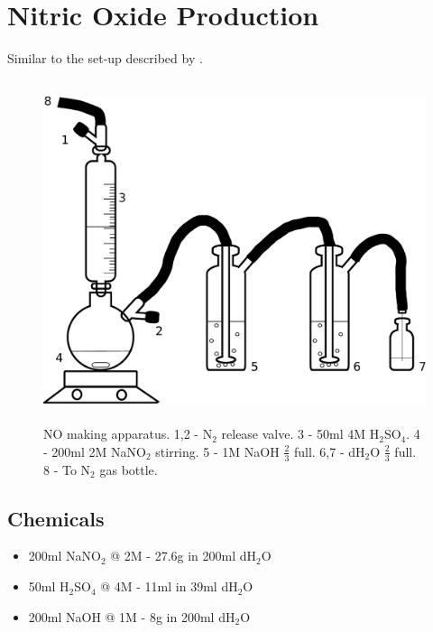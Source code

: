\section{Nitric Oxide Production}
Similar to the set-up described by \cite{Aga2008}.
\begin{figure}
 \centering
 \includegraphics[height=10cm]{./02-materialsmethods/data/drawing.pdf}
 \caption{NO making apparatus. 1,2 - N$_{\textrm{2}}$ release valve. 3 - 50ml 4M H$_{\textrm{2}}$SO$_{\textrm{4}}$. 4 - 200ml 2M NaNO$_{\textrm{2}}$ stirring. 5 - 1M NaOH $\frac{2}{3}$ full. 6,7 - dH$_{\textrm{2}}$O $\frac{2}{3}$ full. 8 - To N$_{\textrm{2}}$ gas bottle.}
\end{figure}
\subsection*{Chemicals}
\begin{itemize}
 \item 200ml NaNO$_{\textrm{2}}$ @ 2M - 27.6g in 200ml dH$_{\textrm{2}}$O
 \item 50ml H$_{\textrm{2}}$SO$_{\textrm{4}}$ @ 4M - 11ml in 39ml dH$_{\textrm{2}}$O
 \item 200ml NaOH @ 1M - 8g in 200ml dH$_{\textrm{2}}$O
\end{itemize}

